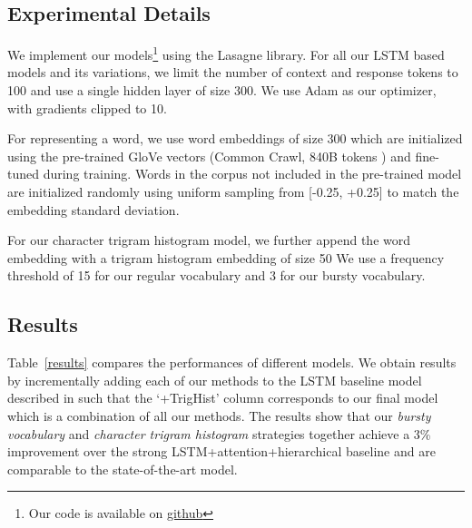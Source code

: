 \documentclass[11pt]{report}
\begin{document}
\subsection{Experimental Details}
We implement our models\footnote{Our code is available on \href{http://github.com/raosudha89/ubuntu_dialogue}{github} } using the Lasagne \cite{lasagne} library. For all our LSTM based models and its variations, we limit the number of context and response tokens to 100 and use a single hidden layer of size 300. We use Adam \cite{kingma2014adam} as our optimizer, with gradients clipped to 10. 

For representing a word, we use word embeddings of size 300 which are initialized using the pre-trained GloVe vectors (Common Crawl, 840B tokens \cite{pennington2014glove}) and fine-tuned during training. Words in the corpus not included in the pre-trained model are initialized randomly using uniform sampling from [-0.25, +0.25] to match the embedding standard deviation. 

For our character trigram histogram model, we further append the word embedding with a trigram histogram embedding of size 50 %
We use a frequency threshold of 15 for our regular vocabulary and 3 for our bursty vocabulary.  

\subsection{Results}
Table~\ref{results} compares the performances of different models. We obtain results by incrementally adding each of our methods to the LSTM baseline model described in \cite{lowe2015ubuntu} such that the `+TrigHist' column corresponds to our final model which is a combination of all our methods.
The results show that our \textit{bursty vocabulary}  and \textit{character trigram histogram} strategies together achieve a 3\% improvement over the strong LSTM+attention+hierarchical baseline and are comparable to the state-of-the-art model. 
\end{document}

